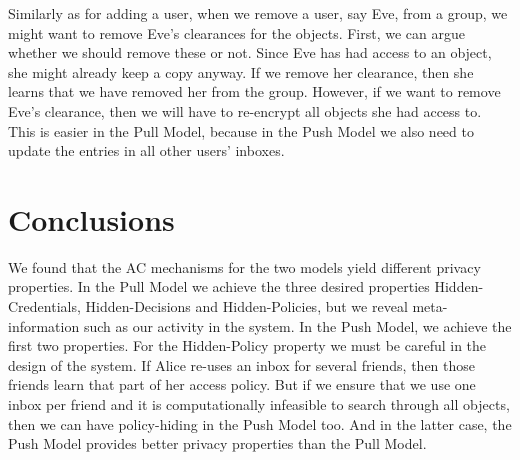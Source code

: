 Similarly as for adding a user, when we remove a user, say Eve, from a group, 
we might want to remove Eve's clearances for the objects.
First, we can argue whether we should remove these or not.
Since Eve has had access to an object, she might already keep a copy anyway.
If we remove her clearance, then she learns that we have removed her from the 
group.
However, if we want to remove Eve's clearance, then we will have to re-encrypt 
all objects she had access to.
This is easier in the Pull Model, because in the Push Model we also need to 
update the entries in all other users' inboxes.


\section{Conclusions}\label{sec:Conclusions}


We found that the \ac{AC} mechanisms for the two models yield different privacy 
properties.
In the Pull Model we achieve the three desired properties Hidden-Credentials, 
Hidden-Decisions and Hidden-Policies, but we reveal meta-information such as 
our activity in the system.
In the Push Model, we achieve the first two properties.
For the Hidden-Policy property we must be careful in the design of the system.
If Alice re-uses an inbox for several friends, then those friends learn that 
part of her access policy.
But if we ensure that we use one inbox per friend and it is computationally 
infeasible to search through all objects, then we can have policy-hiding in the 
Push Model too.
And in the latter case, the Push Model provides better privacy properties than 
the Pull Model.

